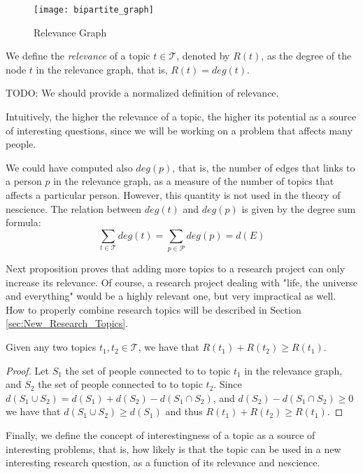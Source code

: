 \begin{figure}[h]
\centering\texttt{[image: bipartite\_graph]}
\caption{\label{fig:Relevance-Graph}Relevance Graph}
\end{figure}

\begin{definition}
\label{def:relevance}
We define the \emph{relevance} of a topic $t \in \mathcal{T}$, denoted by $R(t)$, as the degree of the node $t$ in the relevance graph, that is, $R(t) = deg(t)$.
\end{definition}

{\color{red} TODO: We should provide a normalized definition of relevance.}

Intuitively, the higher the relevance of a topic, the higher its potential as a source of interesting questions, since we will be working on a problem that affects many people.

We could have computed also $deg(p)$, that is, the number of edges that links to a person $p$ in the relevance graph, as a measure of the number of topics that affects a particular person. However, this quantity is not used in the theory of nescience. The relation between $deg(t)$ and $deg(p)$ is given by the degree sum formula:
\[
\sum_{t \in \mathcal{T}} deg(t) = \sum_{p \in \mathcal{P}} deg(p) = d(E)
\]

Next proposition proves that adding more topics to a research project can only increase its relevance. Of course, a research project dealing with "life, the universe and everything" would be a highly relevant one, but very impractical as well. How to properly combine research topics will be described in Section \ref{sec:New_Research_Topics}.

\begin{proposition}
\label{prop:nondecreasing_relevance}
Given any two topics $t_{1}, t_{2} \in \mathcal{T}$, we have that $R(t_{1}) + R(t_{2}) \geq R(t_{1})$.
\end{proposition}
\begin{proof}
Let $S_{1}$ the set of people connected to to topic $t_{1}$ in the relevance graph, and  $S_{2}$ the set of people connected to to topic $t_{2}$. Since $d \left( S_{1} \cup S_{2} \right) = d(S_{1}) + d(S_{2}) - d(S_{1} \cap S_{2})$, and $d(S_{2}) - d(S_{1} \cap S_{2}) \geq 0$ we have that $d \left( S_{1} \cup S_{2} \right) \geq d(S_{1})$ and thus $R(t_{1}) + R(t_{2}) \geq R(t_{1})$.
\end{proof}

Finally, we define the concept of interestingness of a topic as a source of interesting problems, that is, how likely is that the topic can be used in a new interesting research question, as a function of its relevance and nescience.

